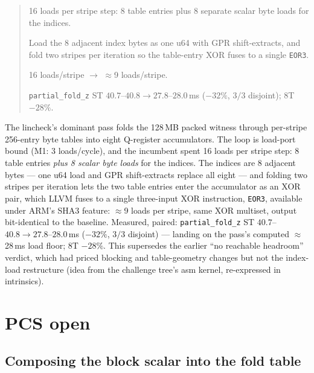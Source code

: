 \documentclass[11pt]{article}
\newcommand{\code}[1]{\texttt{#1}}
\newenvironment{optsummary}{%
  \begin{quote}\small
  \begin{description}
  \setlength{\itemsep}{1pt}\setlength{\parsep}{0pt}\setlength{\topsep}{2pt}
}{%
  \end{description}
  \end{quote}
}
\begin{document}
\begin{optsummary}
\item[Baseline:] 16 loads per stripe step: 8 table entries plus 8 separate scalar byte loads for the indices.
\item[Improvement:] Load the 8 adjacent index bytes as one u64 with GPR shift-extracts, and fold two stripes per iteration so the table-entry XOR fuses to a single \code{EOR3}.
\item[Mechanism:] 16 loads/stripe $\to$ $\approx$9 loads/stripe.
\item[Result:] \code{partial\_fold\_z} ST $40.7$--$40.8\to27.8$--$28.0\,$ms ($-32\%$, $3/3$ disjoint); 8T $-28\%$.
\end{optsummary}

The lincheck's dominant pass folds the 128\,MB packed witness through
per-stripe 256-entry byte tables into eight Q-register accumulators. The
loop is load-port bound (M1: 3 loads/cycle), and the incumbent spent 16
loads per stripe step: 8 table entries \emph{plus 8 scalar byte loads} for
the indices. The indices are 8 adjacent bytes --- one u64 load and GPR
shift-extracts replace all eight --- and folding two stripes per iteration
lets the two table entries enter the accumulator as an XOR pair, which LLVM
fuses to a single three-input XOR instruction, \code{EOR3}, available under
ARM's SHA3 feature: $\approx$9 loads per stripe, same XOR multiset, output
bit-identical to the baseline. Measured, paired:
\code{partial\_fold\_z} ST $40.7$--$40.8 \to 27.8$--$28.0\,$ms ($-32\%$,
$3/3$ disjoint) --- landing on the pass's computed $\approx$28\,ms load
floor; 8T $-28\%$. This supersedes the earlier ``no reachable headroom''
verdict, which had priced blocking and table-geometry changes but not the
index-load restructure (idea from the challenge tree's asm kernel,
re-expressed in intrinsics).

\section{PCS open}

\subsection{Composing the block scalar into the fold table}
\label{sec:composedfold}
\end{document}
